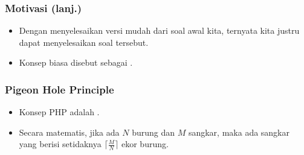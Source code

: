 \begin{frame}
\frametitle{Motivasi (lanj.)}
\begin{itemize}
  \item Dengan menyelesaikan versi mudah dari soal awal kita, ternyata kita justru dapat menyelesaikan soal tersebut.
  \item Konsep  biasa disebut sebagai .
\end{itemize}
\end{frame}

\begin{frame}
\frametitle{Pigeon Hole Principle}
\begin{itemize}
  \item Konsep PHP adalah .
  \item Secara matematis, jika ada $N$ burung dan $M$ sangkar, maka ada sangkar yang berisi setidaknya $\big\lceil \frac{M}{N} \big\rceil$ ekor burung.
\end{itemize}
\end{frame}


